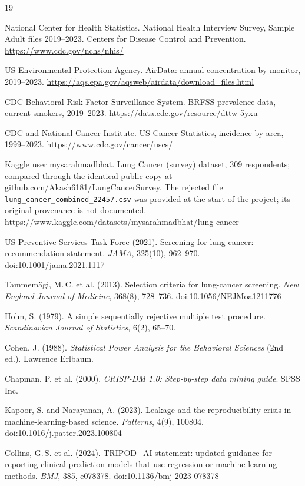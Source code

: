 \begin{thebibliography}{19}
\small

 National Center for Health Statistics. National Health Interview Survey, Sample Adult files 2019--2023. Centers for Disease Control and Prevention. \url{https://www.cdc.gov/nchs/nhis/}

 US Environmental Protection Agency. AirData: annual concentration by monitor, 2019--2023. \url{https://aqs.epa.gov/aqsweb/airdata/download_files.html}

 CDC Behavioral Risk Factor Surveillance System. BRFSS prevalence data, current smokers, 2019--2023. \url{https://data.cdc.gov/resource/dttw-5yxu}

 CDC and National Cancer Institute. US Cancer Statistics, incidence by area, 1999--2023. \url{https://www.cdc.gov/cancer/uscs/}

 Kaggle user mysarahmadbhat. Lung Cancer (survey) dataset, 309 respondents; compared through the identical public copy at github.com/Akash6181/LungCancerSurvey. The rejected file \texttt{lung\_cancer\_combined\_22457.csv} was provided at the start of the project; its original provenance is not documented. \url{https://www.kaggle.com/datasets/mysarahmadbhat/lung-cancer}

 US Preventive Services Task Force (2021). Screening for lung cancer: recommendation statement. \emph{JAMA}, 325(10), 962--970. doi:10.1001/jama.2021.1117

 Tammem\"agi, M.\,C. et al. (2013). Selection criteria for lung-cancer screening. \emph{New England Journal of Medicine}, 368(8), 728--736. doi:10.1056/NEJMoa1211776

 Holm, S. (1979). A simple sequentially rejective multiple test procedure. \emph{Scandinavian Journal of Statistics}, 6(2), 65--70.

 Cohen, J. (1988). \emph{Statistical Power Analysis for the Behavioral Sciences} (2nd ed.). Lawrence Erlbaum.

 Chapman, P. et al. (2000). \emph{CRISP-DM 1.0: Step-by-step data mining guide}. SPSS Inc.

 Kapoor, S. and Narayanan, A. (2023). Leakage and the reproducibility crisis in machine-learning-based science. \emph{Patterns}, 4(9), 100804. doi:10.1016/j.patter.2023.100804

 Collins, G.\,S. et al. (2024). TRIPOD+AI statement: updated guidance for reporting clinical prediction models that use regression or machine learning methods. \emph{BMJ}, 385, e078378. doi:10.1136/bmj-2023-078378


\end{thebibliography}
